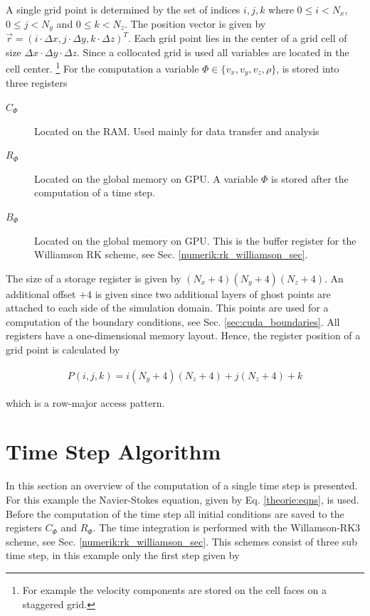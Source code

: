 A single grid point is determined by the set of indices $i,j,k$ where ${0\leq i < N_x}$,
${0\leq j < N_y}$ and ${0\leq k < N_z}$. The position vector is given by ${\vec{r} = (i\cdot\Delta x, j\cdot \Delta y, k\cdot \Delta z)^T}$.
Each grid point lies in the center of a grid cell of size $\Delta x \cdot \Delta y \cdot \Delta z$.
Since a collocated grid is used all variables are located in the cell center.
\footnote{For example the velocity components are stored on the cell faces on a staggered grid.}
For the computation a variable $\Phi\in\{v_x, v_y, v_z, \rho\}$, is stored into three registers

\begin{description}
    \item[$C_\Phi$] Located on the RAM. Used mainly for data transfer and analysis
    \item[$R_\Phi$] Located on the global memory on GPU. A variable $\Phi$ is stored after the computation of a time step.
    \item[$B_\Phi$] Located on the global memory on GPU. This is the buffer register for the Williamson RK scheme, see Sec. \ref{numerik:rk_williamson_sec}.
\end{description}

The size of a storage register is given by $(N_x+4)(N_y+4)(N_z+4)$.
An additional offset $+4$ is given since two additional layers of ghost points are attached to each side of the simulation domain.
This points are used for a computation of the boundary conditions, see Sec. \ref{sec:cuda_boundaries}.
All registers have a one-dimensional memory layout.
Hence, the register position of a grid point is calculated by

\begin{align}
    P(i, j, k) = i(N_y+4)(N_z+4)+j(N_z+4)+k
\end{align}

which is a row-major access pattern.

\section{Time Step Algorithm}
\label{sec:cuda_timestep}

In this section an overview of the computation of a single time step is presented.
For this example the Navier-Stokes equation, given by Eq. \ref{theorie:eqns}, is used.
Before the computation of the time step all initial conditions are saved to the
registers $C_{\Phi}$ and  $R_{\Phi}$.
The time integration is performed with the Willamson-RK3 scheme, see Sec. \ref{numerik:rk_williamson_sec}.
This schemes consist of three sub time step, in this example only the first step given by

